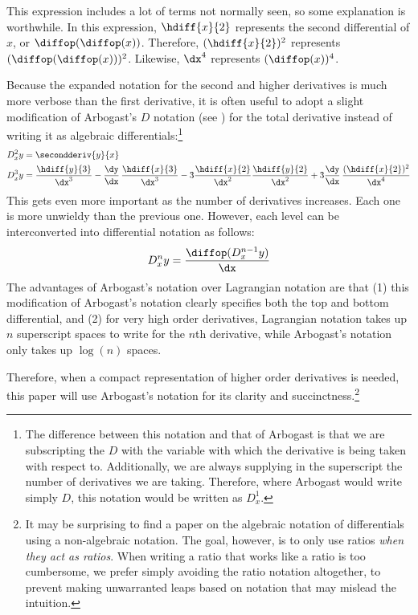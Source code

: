 This expression includes a lot of terms not normally seen, so some explanation is worthwhile.
In this expression, $\hdiff{x}{2}$ represents the second differential of $x$, or $\diffop(\diffop(x))$. 
Therefore, $(\hdiff{x}{2})^2$ represents $(\diffop(\diffop(x)))^2$.
Likewise, $\dx^4$ represents $(\diffop(x))^4$.

Because the expanded notation for the second and higher derivatives is much more verbose than the first derivative, it is often useful to adopt a slight modification of Arbogast's $D$ notation (see \citep[pgs.~209,218--219]{cajori2}) for the total derivative instead of writing it as algebraic differentials:\footnote{The difference between this notation and that of Arbogast is that we are subscripting the $D$ with the variable with which the derivative is being taken with respect to. Additionally, we are always supplying in the superscript the number of derivatives we are taking.  Therefore, where Arbogast would write simply $D$, this notation would be written as $D_x^1$.}
\begin{align}
D_{x}^2y &= \secondderiv{y}{x} \\
D_{x}^3y &= \frac{\hdiff{y}{3}}{\dx^3} - \frac{\dy}{\dx}\,\frac{\hdiff{x}{3}}{\dx^3} - 3\frac{\hdiff{x}{2}}{\dx^2}\frac{\hdiff{y}{2}}{\dx^2} + 3\frac{\dy}{\dx}\,\frac{(\hdiff{x}{2})^2}{\dx^4}
\end{align}
This gets even more important as the number of derivatives increases.
Each one is more unwieldy than the previous one.
However, each level can be interconverted into differential notation as follows:
\begin{equation}
D_{x}^{n}y = \frac{\diffop(D_{x}^{n-1}y)}{\dx}
\end{equation}
The advantages of Arbogast's notation over Lagrangian notation are that (1) this modification of Arbogast's notation clearly specifies both the top and bottom differential, and (2) for very high order derivatives, Lagrangian notation takes up $n$ superscript spaces to write for the $n$th derivative, while Arbogast's notation only takes up $\log(n)$ spaces.

Therefore, when a compact representation of higher order derivatives is needed, this paper will use Arbogast's notation for its clarity and succinctness.\footnote{It may be surprising to find a paper on the algebraic notation of differentials using a non-algebraic notation.  The goal, however, is to only use ratios \emph{when they act as ratios}.  When writing a ratio that works like a ratio is too cumbersome, we prefer simply avoiding the ratio notation altogether, to prevent making unwarranted leaps based on notation that may mislead the intuition.}

